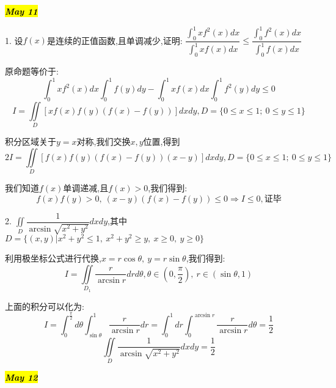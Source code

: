 \hl{\textbf{\textit{May 11}}}

1. 设$f(x)$是连续的正值函数,且单调减少,证明: $\dfrac{\int_{0}^{1}xf^{2}(x)dx}{\int_{0}^{1}xf(x)dx}\leq \dfrac{\int_{0}^{1}f^{2}(x)dx}{\int_{0}^{1}f(x)dx}$
\begin{solution}
	
	原命题等价于: 
	$$\int_{0}^{1}xf^{2}(x)dx\int_{0}^{1}f(y)dy-\int_{0}^{1}xf(x)dx\int_{0}^{1}f^{2}(y)dy\leq 0$$
	$$I=\iint\limits_{D}[xf(x)f(y)(f(x)-f(y))]dxdy,D=\{0\leq x\leq 1;\ 0\leq y\leq 1 \}$$
	
	积分区域关于$y=x$对称,我们交换$x,y$位置,得到
	$$2I=\iint\limits_{D}[f(x)f(y)(f(x)-f(y))(x-y)]dxdy,D=\{0\leq x\leq 1;\ 0\leq y\leq 1 \}$$
	
	我们知道$f(x)$单调递减,且$f(x)>0$,我们得到: 
	$$f(x)f(y)>0,\ (x-y)(f(x)-f(y))\leq 0\Rightarrow I\leq 0,\text{证毕}$$
\end{solution}

2. $\iint\limits_{D}\dfrac{1}{\arcsin\sqrt{x^2+y^2}}dxdy$,其中$D=\{(x,y)|x^2+y^2\leq 1,\ x^2+y^2\geq y,\ x\geq 0,\ y\geq 0\}$
\begin{solution}
	
	利用极坐标公式进行代换,$x=r\cos \theta,\ y=r\sin \theta$,我们得到: 
	$$I=\iint\limits_{D_{1}}\dfrac{r}{\arcsin r}drd\theta,\theta\in(0,\frac{\pi}{2}),\ r\in(\sin\theta,1)$$
	
	上面的积分可以化为: 
	$$I=\int_{0}^{\frac{\pi}{2}}d\theta\int_{\sin\theta}^{1}\dfrac{r}{\arcsin r}dr=\int_{0}^{1}dr\int_{0}^{\arcsin r}\frac{r}{\arcsin r}d\theta=\frac{1}{2}$$
	$$\iint\limits_{D}\dfrac{1}{\arcsin\sqrt{x^2+y^2}}dxdy=\frac{1}{2}$$
\end{solution}

\hl{\textbf{\textit{May 12}}}

